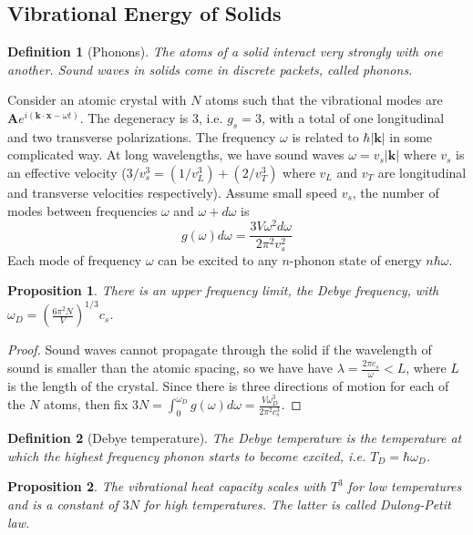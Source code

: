 \documentclass[a4paper]{article}
\theoremstyle{new}
\newtheorem{defi}{Definition}[section]
\newtheorem{prop}{Proposition}[section]
\begin{document}
\subsection{Vibrational Energy of Solids}
\begin{defi}[Phonons]
The atoms of a solid interact very strongly with one another. Sound waves in solids come in discrete packets, called phonons.
\end{defi}
Consider an atomic crystal with $N$ atoms such that the vibrational modes are $\mathbf{A}e^{i(\mathbf{k}\cdot\mathbf{x}-\omega t)}$. The degeneracy is 3, i.e. $g_s=3$, with a total of one longitudinal and two transverse polarizations. The frequency $\omega$ is related to $\hbar|\mathbf{k}|$ in some complicated way. At long wavelengths, we have sound waves $\omega=v_s|\mathbf{k}|$ where $v_s$ is an effective velocity ($3/v_s^3=(1/v_L^3)+(2/v_T^3)$ where $v_L$ and $v_T$ are longitudinal and transverse velocities respectively).  Assume small speed $v_s$, the number of modes between frequencies $\omega$ and $\omega+d\omega$ is
$$g(\omega)d\omega=\frac{3V\omega^2d\omega}{2\pi^2v_s^2}$$
Each mode of frequency $\omega$ can be excited to any $n$-phonon state of energy $n\hbar\omega$. 
\begin{prop}
There is an upper frequency limit, the Debye frequency, with $\omega_D=(\frac{6\pi^2N}{V})^{1/3}c_s$.
\end{prop}
\begin{proof}
Sound waves cannot propagate through the solid if the wavelength of sound is smaller than the atomic spacing, so we have have $\lambda=\frac{2\pi c_s}{\omega}<L$, where $L$ is the length of the crystal. Since there is three directions of motion for each of the $N$ atoms, then fix  $3N=\int_0^{\omega_D}g(\omega)d\omega=\frac{V\omega_D^3}{2\pi^2c_s^3}$.
\end{proof}
\begin{defi}[Debye temperature]
The Debye temperature is the temperature at which the highest frequency phonon starts to become excited, i.e. $T_D=\hbar\omega_D$.
\end{defi}
\begin{prop}
The vibrational heat capacity scales with $T^3$ for low temperatures and is a constant of $3N$ for high temperatures. The latter is called Dulong-Petit law.
\end{prop}
\end{document}
